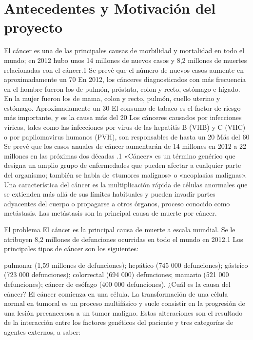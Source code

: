 \documentclass[../pfc.tex]{subfiles}
\begin{document}
\section{Antecedentes y Motivación del proyecto}
El cáncer es una de las principales causas de morbilidad y mortalidad en todo el mundo; en 2012 hubo unos 14 millones de nuevos casos y 8,2 millones de muertes relacionadas con el cáncer.1
Se prevé que el número de nuevos casos aumente en aproximadamente un 70%
En 2012, los cánceres diagnosticados con más frecuencia en el hombre fueron los de pulmón, próstata, colon y recto, estómago e hígado.
En la mujer fueron los de mama, colon y recto, pulmón, cuello uterino y estómago.
Aproximadamente un 30%
El consumo de tabaco es el factor de riesgo más importante, y es la causa más del 20%
Los cánceres causados por infecciones víricas, tales como las infecciones por virus de las hepatitis B (VHB) y C (VHC) o por papilomavirus humanos (PVH), son responsables de hasta un 20%
Más del 60%
Se prevé que los casos anuales de cáncer aumentarán de 14 millones en 2012 a 22 millones en las próximas dos décadas .1
«Cáncer» es un término genérico que designa un amplio grupo de enfermedades que pueden afectar a cualquier parte del organismo; también se habla de «tumores malignos» o «neoplasias malignas». Una característica del cáncer es la multiplicación rápida de células anormales que se extienden más allá de sus límites habituales y pueden invadir partes adyacentes del cuerpo o propagarse a otros órganos, proceso conocido como metástasis. Las metástasis son la principal causa de muerte por cáncer.

El problema
El cáncer es la principal causa de muerte a escala mundial. Se le atribuyen 8,2 millones de defunciones ocurridas en todo el mundo en 2012.1 Los principales tipos de cáncer son los siguientes:

pulmonar (1,59 millones de defunciones);
hepático (745 000 defunciones);
gástrico (723 000 defunciones);
colorrectal (694 000) defunciones;
mamario (521 000 defunciones);
cáncer de esófago (400 000 defunciones).
¿Cuál es la causa del cáncer?
El cáncer comienza en una célula. La transformación de una célula normal en tumoral es un proceso multifásico y suele consistir en la progresión de una lesión precancerosa a un tumor maligno. Estas alteraciones son el resultado de la interacción entre los factores genéticos del paciente y tres categorías de agentes externos, a saber:
\end{document}
